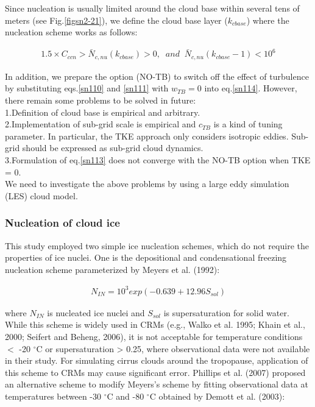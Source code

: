 Since nucleation is usually limited around the cloud base within several tens of meters (see Fig.\ref{figsn2-21}), we define the cloud base layer ($k_{cbase}$) where the nucleation scheme works as follows:

\begin{eqnarray}
1.5 \times C_{ccn} > \bar{N}_{c,nu}(k_{cbase})>0,\;\;and\;\;\bar{N}_{c,nu}(k_{cbase}-1) < 10^{6}\label{sn116}
\end{eqnarray}

In addition, we prepare the option (NO-TB) to switch off the effect of turbulence by substituting eqs.\ref{sn110} and \ref{sn111} with $w_{TB} = 0$ into eq.\ref{sn114}. However, there remain some problems to be solved in future:\\
1.Definition of cloud base is empirical and arbitrary.\\
2.Implementation of sub-grid scale is empirical and $c_{TB}$ is a kind of tuning parameter. In particular, the TKE approach only considers isotropic eddies. Sub-grid should be expressed as sub-grid cloud dynamics.\\
3.Formulation of eq.\ref{sn113} does not converge with the NO-TB option when TKE = 0.\\
We need to investigate the above problems by using a large eddy simulation (LES) cloud model.

\subsubsection{Nucleation of cloud ice}
This study employed two simple ice nucleation schemes, which do not require the properties of ice nuclei. One is the depositional and condensational freezing nucleation scheme parameterized by Meyers et al. (1992):

\begin{eqnarray}
N_{IN}=10^{3}exp(-0.639+12.96S_{sol})\nonumber
\end{eqnarray}

where $N_{IN}$ is nucleated ice nuclei and $S_{sol}$ is supersaturation for solid water. While this scheme is widely used in CRMs (e.g., Walko et al. 1995; Khain et al., 2000; Seifert and Beheng, 2006), it is not acceptable for temperature conditions $<$ -20 $^\circ$C or supersaturation > 0.25, where observational data were not available in their study. For simulating cirrus clouds around the tropopause, application of this scheme to CRMs may cause significant error. Phillips et al. (2007) proposed an alternative scheme to modify Meyers’s scheme by fitting observational data at temperatures between -30 $^\circ$C and -80 $^\circ$C obtained by Demott et al. (2003):

